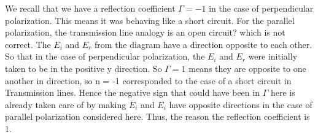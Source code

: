 We recall that we have a reflection coefficient $\Gamma = -1$ in the case of perpendicular polarization. This means it was behaving like a short circuit. For the parallel polarization, the transmission line analogy is an open circuit? which is not correct. The $E_{i}$ and $E_{r}$ from the diagram have a direction opposite to each other. So that in the case of perpendicular polarization, the $E_{i}$ and $ E_{r}$  were initially taken to be in the positive y direction. So   $\Gamma = 1$ means they are opposite to one another in direction, so n = -1 corresponded to the case of a short circuit in Transmission lines. Hence the negative sign that could have been in $\Gamma$ here is already taken care of by making $E_{i}$ and $E_{i}$ have opposite directions in the case of parallel polarization considered here. Thus, the reason the reflection coefficient is 1. 

